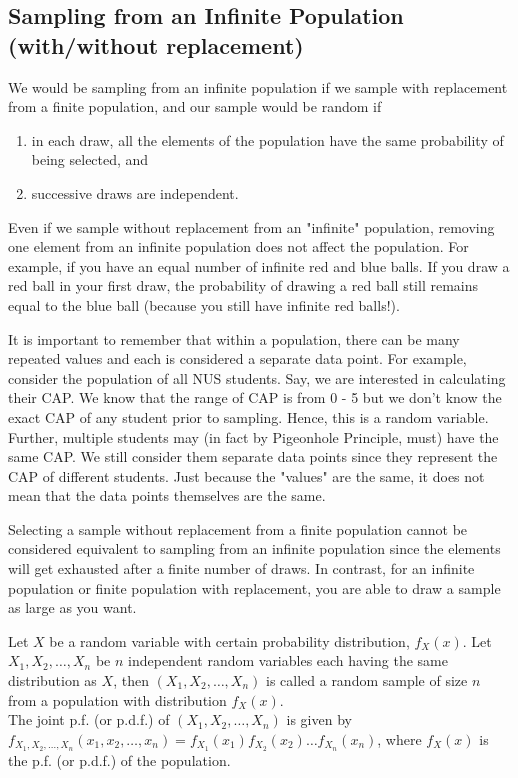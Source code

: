 \subsection{Sampling from an Infinite Population (with/without replacement)}
We would be sampling from an infinite population if we sample with replacement from a finite population, and our sample would be random if
\begin{enumerate}
    \item in each draw, all the elements of the population have the same probability of being selected, and
    \item successive draws are independent.
\end{enumerate}
Even if we sample without replacement from an "infinite" population, removing one element from an infinite population does not affect the population. For example, if you have an equal number of infinite red and blue balls. If you draw a red ball in your first draw, the probability of drawing a red ball still remains equal to the blue ball (because you still have infinite red balls!).
\begin{note}
\end{note}
It is important to remember that within a population, there can be many repeated values and each is considered a separate data point. For example, consider the population of all NUS students. Say, we are interested in calculating their CAP. We know that the range of CAP is from 0 - 5 but we don't know the exact CAP of any student prior to sampling. Hence, this is a random variable. Further, multiple students may (in fact by Pigeonhole Principle, must) have the same CAP. We still consider them separate data points since they represent the CAP of different students. Just because the "values" are the same, it does not mean that the data points themselves are the same. 
\begin{note}
\end{note}
Selecting a sample without replacement from a finite population cannot be considered equivalent to sampling from an infinite population since the elements will get exhausted after a finite number of draws. In contrast, for an infinite population or
finite population with replacement, you are able to draw a sample as large as you want.
\begin{definition}
Let $X$ be a random variable with certain probability distribution, $f_X(x)$. Let $X_1, X_2, \dots , X_n$ be $n$ independent random variables each having the same distribution as $X$, then $(X_1, X_2, \dots, X_n)$ is called a random sample of size $n$ from a population with distribution $f_X(x)$.\\
The joint p.f. (or p.d.f.) of $(X_1, X_2, \dots, X_n)$ is given by $f_{X_1, X_2, \dots, X_n}(x_1, x_2, \dots, x_n) = f_{X_1}(x_1)f_{X_2}(x_2) \dots f_{X_n}(x_n)$, where $f_X(x)$ is the p.f. (or p.d.f.) of the population.
\end{definition}

